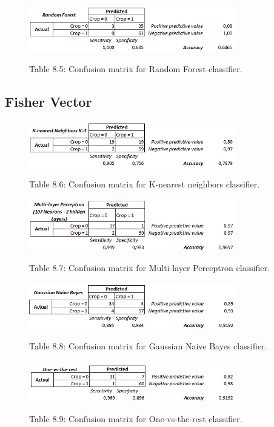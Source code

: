 \documentclass[12pt]{article}
\numberwithin{equation}{section}
\numberwithin{table}{section}
\numberwithin{figure}{section}
\begin{document}
\begin{figure}[H] \centering
	\caption*{Table 8.5: Confusion matrix for Random Forest classifier. }
	\includegraphics[width=0.8\textwidth]{m5.png}
	\label{m5}
\end{figure}

\subsection{Fisher Vector}

\begin{figure}[H] \centering
	\caption*{Table 8.6: Confusion matrix for K-nearest neighbors classifier. }
	\includegraphics[width=0.8\textwidth]{m6.png}
	\label{m6}
\end{figure}

\begin{figure}[H] \centering
	\caption*{Table 8.7: Confusion matrix for Multi-layer Perceptron classifier. }
	\includegraphics[width=0.8\textwidth]{m7.png}
	\label{m7}
\end{figure}

\begin{figure}[H] \centering
	\caption*{Table 8.8: Confusion matrix for Gaussian Naive Bayes classifier. }
	\includegraphics[width=0.8\textwidth]{m8.png}
	\label{m8}
\end{figure}

\begin{figure}[H] \centering
	\caption*{Table 8.9: Confusion matrix for One-vs-the-rest classifier. }
	\includegraphics[width=0.8\textwidth]{m9.png}
	\label{m9}
\end{figure}
\end{document}
